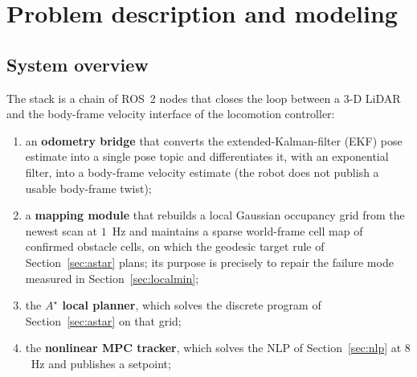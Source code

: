 \documentclass[11pt,a4paper]{article}
\newcommand{\astar}{$A^\star$}
\begin{document}

\section{Problem description and modeling}
\label{sec:problem}

\subsection{System overview}
\label{sec:overview}

The stack is a chain of ROS~2 nodes that closes the loop between a 3-D LiDAR and the
body-frame velocity interface of the locomotion controller:

\begin{enumerate}[label=\arabic*.]
  \item an \textbf{odometry bridge} that converts the extended-Kalman-filter (EKF) pose estimate into a
        single pose topic and differentiates it, with an exponential filter, into a body-frame velocity estimate (the robot does
        not publish a usable body-frame twist);
  \item a \textbf{mapping module} that rebuilds a local Gaussian occupancy grid from the newest scan at
        $1$~Hz and maintains a sparse world-frame cell map of confirmed obstacle cells, on which the geodesic target rule of Section~\ref{sec:astar} plans; its purpose
        is precisely to repair the failure mode measured in Section~\ref{sec:localmin};
  \item the \textbf{\astar{} local planner}, which solves the discrete program of
        Section~\ref{sec:astar} on that grid;
  \item the \textbf{nonlinear MPC tracker}, which solves the NLP of Section~\ref{sec:nlp} at $8$~Hz and
        publishes a setpoint;
\end{enumerate}

\end{document}
